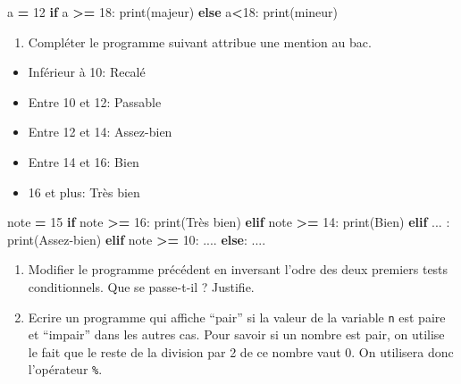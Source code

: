 \documentclass[
]{book}
\newenvironment{Shaded}{\begin{snugshade}}{\end{snugshade}}
\newcommand{\BuiltInTok}[1]{#1}
\newcommand{\ControlFlowTok}[1]{\textcolor[rgb]{0.13,0.29,0.53}{\textbf{#1}}}
\newcommand{\DecValTok}[1]{\textcolor[rgb]{0.00,0.00,0.81}{#1}}
\newcommand{\NormalTok}[1]{#1}
\newcommand{\OperatorTok}[1]{\textcolor[rgb]{0.81,0.36,0.00}{\textbf{#1}}}
\newcommand{\StringTok}[1]{\textcolor[rgb]{0.31,0.60,0.02}{#1}}
\providecommand{\tightlist}{%
  \setlength{\itemsep}{0pt}\setlength{\parskip}{0pt}}
\def\tightlist{}
\begin{document}
\begin{Shaded}
\begin{Highlighting}[]
\NormalTok{a }\OperatorTok{=} \DecValTok{12}
\ControlFlowTok{if}\NormalTok{ a }\OperatorTok{\textgreater{}=} \DecValTok{18}\NormalTok{:}
  \BuiltInTok{print}\NormalTok{(}\StringTok{\textquotesingle{}majeur\textquotesingle{}}\NormalTok{)}
\ControlFlowTok{else}\NormalTok{ a}\OperatorTok{\textless{}}\DecValTok{18}\NormalTok{:}
  \BuiltInTok{print}\NormalTok{(}\StringTok{\textquotesingle{}mineur\textquotesingle{}}\NormalTok{)}
\end{Highlighting}
\end{Shaded}

\begin{enumerate}
\def\labelenumi{\arabic{enumi}.}
\setcounter{enumi}{3}
\tightlist
\item
  Compléter le programme suivant attribue une mention au bac.
\end{enumerate}

\begin{itemize}
\tightlist
\item
  Inférieur à 10: Recalé
\item
  Entre 10 et 12: Passable
\item
  Entre 12 et 14: Assez-bien
\item
  Entre 14 et 16: Bien
\item
  16 et plus: Très bien
\end{itemize}

\begin{Shaded}
\begin{Highlighting}[]
\NormalTok{note }\OperatorTok{=} \DecValTok{15}
\ControlFlowTok{if}\NormalTok{ note }\OperatorTok{\textgreater{}=} \DecValTok{16}\NormalTok{:}
  \BuiltInTok{print}\NormalTok{(}\StringTok{\textquotesingle{}Très bien\textquotesingle{}}\NormalTok{)}
\ControlFlowTok{elif}\NormalTok{ note }\OperatorTok{\textgreater{}=} \DecValTok{14}\NormalTok{: }
  \BuiltInTok{print}\NormalTok{(}\StringTok{\textquotesingle{}Bien\textquotesingle{}}\NormalTok{)}
\ControlFlowTok{elif}\NormalTok{ ... : }
  \BuiltInTok{print}\NormalTok{(}\StringTok{\textquotesingle{}Assez{-}bien\textquotesingle{}}\NormalTok{)}
\ControlFlowTok{elif}\NormalTok{ note }\OperatorTok{\textgreater{}=} \DecValTok{10}\NormalTok{:}
\NormalTok{  ....}
\ControlFlowTok{else}\NormalTok{:}
\NormalTok{  ....}
\end{Highlighting}
\end{Shaded}

\begin{enumerate}
\def\labelenumi{\arabic{enumi}.}
\setcounter{enumi}{4}
\tightlist
\item
  Modifier le programme précédent en inversant l'odre des deux premiers tests conditionnels. Que se passe-t-il ? Justifie.
\item
  Ecrire un programme qui affiche ``pair'' si la valeur de la variable \texttt{n} est paire et ``impair'' dans les autres cas. Pour savoir si un nombre est pair, on utilise le fait que le reste de la division par 2 de ce nombre vaut 0. On utilisera donc l'opérateur \texttt{\%}.
\end{enumerate}
\end{document}
